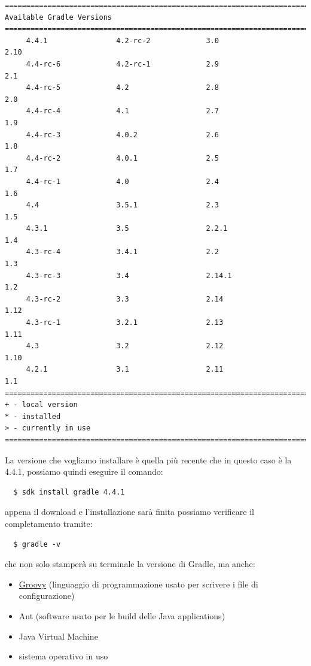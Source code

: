 \begin{verbatim}
================================================================================
Available Gradle Versions
================================================================================
     4.4.1                4.2-rc-2             3.0                  2.10           
     4.4-rc-6             4.2-rc-1             2.9                  2.1            
     4.4-rc-5             4.2                  2.8                  2.0            
     4.4-rc-4             4.1                  2.7                  1.9            
     4.4-rc-3             4.0.2                2.6                  1.8            
     4.4-rc-2             4.0.1                2.5                  1.7            
     4.4-rc-1             4.0                  2.4                  1.6            
     4.4                  3.5.1                2.3                  1.5            
     4.3.1                3.5                  2.2.1                1.4            
     4.3-rc-4             3.4.1                2.2                  1.3            
     4.3-rc-3             3.4                  2.14.1               1.2            
     4.3-rc-2             3.3                  2.14                 1.12           
     4.3-rc-1             3.2.1                2.13                 1.11           
     4.3                  3.2                  2.12                 1.10           
     4.2.1                3.1                  2.11                 1.1            
================================================================================
+ - local version
* - installed
> - currently in use
================================================================================ \end{verbatim}
La versione che vogliamo installare è quella più recente che in questo caso è la 4.4.1, possiamo quindi eseguire il comando:
\begin{verbatim}
  $ sdk install gradle 4.4.1 \end{verbatim}
appena il download e l'installazione sarà finita possiamo verificare il completamento tramite:
\begin{verbatim}
  $ gradle -v \end{verbatim}
che non solo stamperà su terminale la versione di Gradle, ma anche:
\begin{itemize}
  \item \href{http://www.groovy-lang.org/}{Groovy} (linguaggio di programmazione usato per scrivere i file di configurazione)
  \item Ant (software usato per le build delle Java applications)
  \item Java Virtual Machine
  \item sistema operativo in uso
\end{itemize}
